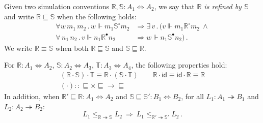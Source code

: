\documentclass[sigplan,screen]{acmart}
\newcommand{\kw}[1]{\ensuremath{ \mathsf{#1} }}
\newcommand{\que}{\circ}
\newcommand{\ans}{\bullet}
\newcommand{\screfd}{\sqsubseteq}
\begin{document}
\begin{definition} %
Given two simulation conventions
$\mathbb{R}, \mathbb{S} : A_1 \Leftrightarrow A_2$,
we say that
\emph{$\mathbb{R}$ is refined by $\mathbb{S}$} and write
$\mathbb{R} \screfd \mathbb{S}$
when the following holds:
\begin{align*}
  \forall w \, m_1 \, m_2 \,.\,
  w \Vdash m_1 \mathrel{\mathbb{S}^\que} m_2 &\Rightarrow
  \exists \, v \,.\, (
  v \Vdash m_1 \mathrel{\mathbb{R}^\que} m_2
  \: \wedge \\
  \forall \, n_1 \, n_2 \,.\,
  v \Vdash n_1 \mathrel{\mathbb{R}^\ans} n_2 &\Rightarrow
  w \Vdash n_1 \mathrel{\mathbb{S}^\ans} n_2) \,.
\end{align*}
We write $\mathbb{R} \equiv \mathbb{S}$ when both
$\mathbb{R} \screfd \mathbb{S}$ and
$\mathbb{S} \screfd \mathbb{R}$.
\end{definition}

\begin{theorem} \label{thm:sccomp} %
For
$\mathbb{R} : A_1 \Leftrightarrow A_2$,
$\mathbb{S} : A_2 \Leftrightarrow A_3$,
$\mathbb{T} : A_3 \Leftrightarrow A_4$,
the following properties hold:
\begin{gather*}
  (\mathbb{R} \cdot \mathbb{S}) \cdot \mathbb{T} \equiv
    \mathbb{R} \cdot (\mathbb{S} \cdot \mathbb{T})
  \qquad
  \mathbb{R} \cdot \kw{id} \equiv
  \kw{id} \cdot \mathbb{R} \equiv
  \mathbb{R}
  \\
  ({\cdot}) :: {{\screfd} \times {\screfd} \rightarrow {\screfd}}
\end{gather*}
In addition, when
$\mathbb{R}' \screfd \mathbb{R} : A_1 \Leftrightarrow A_2$ and
$\mathbb{S} \screfd \mathbb{S}' : B_1 \Leftrightarrow B_2$,
for all
$L_1 : A_1 \twoheadrightarrow B_1$ and $L_2 : A_2 \twoheadrightarrow B_2$:
\[
      L_1 \le_{\mathbb{R} \twoheadrightarrow \mathbb{S}} L_2
      \: \Rightarrow \:
      L_1 \le_{\mathbb{R}' \twoheadrightarrow \mathbb{S}'} L_2 \,.
\]
\end{theorem}
\end{document}
